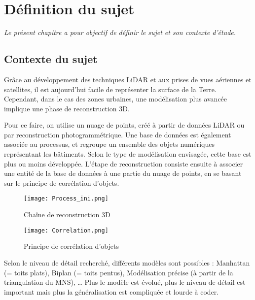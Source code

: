 \chapter[Définition du sujet]{Définition du sujet}

\textit{Le présent chapitre a pour objectif de définir le sujet et son contexte d'étude. }

\section{Contexte du sujet}

Grâce au développement des techniques LiDAR et aux prises de vues aériennes et satellites, il est aujourd'hui facile de représenter la surface de la Terre. Cependant, dans le cas des zones urbaines, une modélisation plus avancée implique une phase de reconstruction 3D. \newline

Pour ce faire, on utilise un nuage de points, créé à partir de données LiDAR ou par reconstruction photogrammétrique. Une base de données est également associée au processus, et regroupe un ensemble des objets numériques représentant les bâtiments. Selon le type de modélisation envisagée, cette base est plus ou moins développée. L’étape de reconstruction consiste ensuite à associer une entité de la base de données à une partie du nuage de points, en se basant sur le principe de corrélation d’objets.\newline

\begin{figure}[!h]
	\begin{center}
		\texttt{[image: Process\_ini.png]}  \\
		\caption[Chaîne de reconstruction 3D]{Chaîne de reconstruction 3D}
		\label{fig:recons3D}
	\end{center}
\end{figure}

\begin{figure}[!h]
	\begin{center}
		\texttt{[image: Correlation.png]}  \\
		\caption[Principe de corrélation d'objets]{Principe de corrélation d'objets}
		\label{fig:correlobj}
	\end{center}
\end{figure}

Selon le niveau de détail recherché, différents modèles sont possibles : Manhattan (= toits plats), Biplan (= toits pentus), Modélisation précise (à partir de la triangulation du MNS), … Plus le modèle est évolué, plus le niveau de détail est important mais plus la généralisation est compliquée et lourde à coder. \newline

